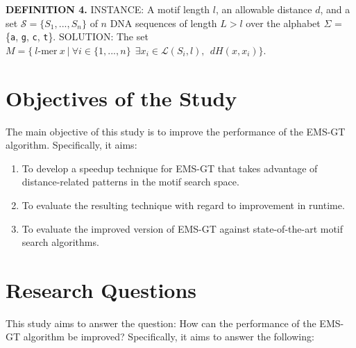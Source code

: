 \documentclass[oneside,12pt]{DISCSthesis}
\begin{document}
		\noindent\textbf{\boldmath DEFINITION 4.}
		\newline
		\noindent INSTANCE: A motif length $l$, an allowable distance $d$, and a set $\mathcal{S} = \{S_{1},..., S_{n}\}$\newline
		\noindent\hspace*{55pt}of $n$ DNA sequences of length $L > l$ over the alphabet $\Sigma$ = \{\texttt{a}, \texttt{g}, \texttt{c}, \texttt{t}\}.\newline
		\noindent SOLUTION: The set $M = \{\ l\text{-mer}\ x\ |\ \forall i \in \{1,...,n\}\ \ \exists x_i \in \mathcal{L}(S_i,l),\ \ dH(x, x_i) \}$.

		
	\newpage
	\section{Objectives of the Study}
		The main objective of this study is to improve the performance of the EMS-GT algorithm. Specifically, it aims:
		\begin{enumerate}
		\item To develop a speedup technique for EMS-GT that takes advantage of distance-related patterns in the motif search space.
		\item To evaluate the resulting technique with regard to improvement in runtime. %
		\item To evaluate the improved version of EMS-GT against state-of-the-art motif search algorithms.
		\end{enumerate}

	\section{Research Questions}
		This study aims to answer the question: How can the performance of the EMS-GT algorithm be improved?
		Specifically, it aims to answer the following:
\end{document}
